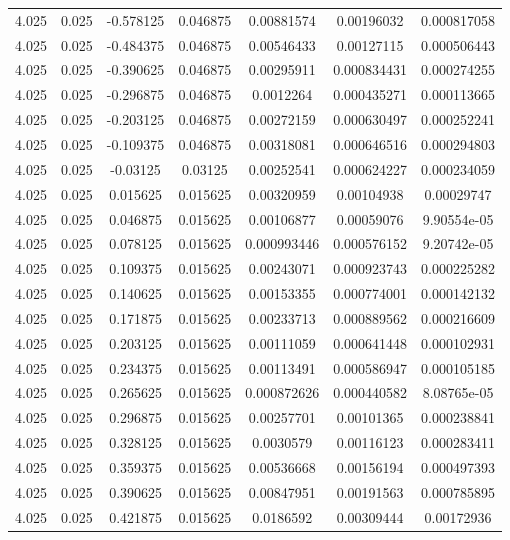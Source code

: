 \begin{table}[bh]
\begin{center}
{\begin{tabular}{ccccccc}
4.025	 & 0.025 & 	-0.578125	 & 0.046875	 & 0.00881574	 & 0.00196032	 & 0.000817058 \\ 
4.025	 & 0.025 & 	-0.484375	 & 0.046875	 & 0.00546433	 & 0.00127115	 & 0.000506443 \\ 
4.025	 & 0.025 & 	-0.390625	 & 0.046875	 & 0.00295911	 & 0.000834431	 & 0.000274255 \\ 
4.025	 & 0.025 & 	-0.296875	 & 0.046875	 & 0.0012264	 & 0.000435271	 & 0.000113665 \\ 
4.025	 & 0.025 & 	-0.203125	 & 0.046875	 & 0.00272159	 & 0.000630497	 & 0.000252241 \\ 
4.025	 & 0.025 & 	-0.109375	 & 0.046875	 & 0.00318081	 & 0.000646516	 & 0.000294803 \\ 
4.025	 & 0.025 & 	-0.03125	 & 0.03125	 & 0.00252541	 & 0.000624227	 & 0.000234059 \\ 
4.025	 & 0.025 & 	0.015625	 & 0.015625	 & 0.00320959	 & 0.00104938	 & 0.00029747 \\ 
4.025	 & 0.025 & 	0.046875	 & 0.015625	 & 0.00106877	 & 0.00059076	 & 9.90554e-05 \\ 
4.025	 & 0.025 & 	0.078125	 & 0.015625	 & 0.000993446	 & 0.000576152	 & 9.20742e-05 \\ 
4.025	 & 0.025 & 	0.109375	 & 0.015625	 & 0.00243071	 & 0.000923743	 & 0.000225282 \\ 
4.025	 & 0.025 & 	0.140625	 & 0.015625	 & 0.00153355	 & 0.000774001	 & 0.000142132 \\ 
4.025	 & 0.025 & 	0.171875	 & 0.015625	 & 0.00233713	 & 0.000889562	 & 0.000216609 \\ 
4.025	 & 0.025 & 	0.203125	 & 0.015625	 & 0.00111059	 & 0.000641448	 & 0.000102931 \\ 
4.025	 & 0.025 & 	0.234375	 & 0.015625	 & 0.00113491	 & 0.000586947	 & 0.000105185 \\ 
4.025	 & 0.025 & 	0.265625	 & 0.015625	 & 0.000872626	 & 0.000440582	 & 8.08765e-05 \\ 
4.025	 & 0.025 & 	0.296875	 & 0.015625	 & 0.00257701	 & 0.00101365	 & 0.000238841 \\ 
4.025	 & 0.025 & 	0.328125	 & 0.015625	 & 0.0030579	 & 0.00116123	 & 0.000283411 \\ 
4.025	 & 0.025 & 	0.359375	 & 0.015625	 & 0.00536668	 & 0.00156194	 & 0.000497393 \\ 
4.025	 & 0.025 & 	0.390625	 & 0.015625	 & 0.00847951	 & 0.00191563	 & 0.000785895 \\ 
4.025	 & 0.025 & 	0.421875	 & 0.015625	 & 0.0186592	 & 0.00309444	 & 0.00172936 \\ 

\end{tabular}}
\end{center}
\end{table}
